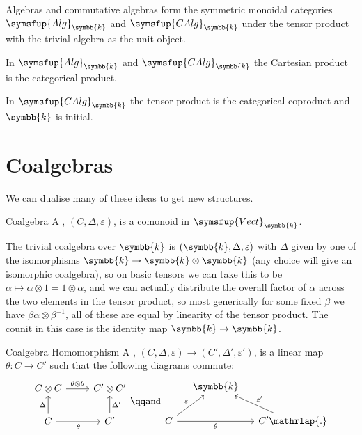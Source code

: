 \documentclass[fleqn]{NotesClass}
\makeatletter
\newcommand{\c@egory}[1]{\symsfup{#1}}
\newcommand{\Vect}[1][\field]{\c@egory{Vect}_{#1}}
\newcommand{\Alg}[1][\field]{\c@egory{Alg}_{#1}}
\newcommand{\CAlg}[1][\field]{\c@egory{CAlg}_{#1}}
\renewcommand{\field}{\symbb{k}}
\makeatother
\begin{document}
    \begin{thm}{}{}
        Algebras and commutative algebras form the symmetric monoidal categories \(\Alg\) and \(\CAlg\) under the tensor product with the trivial algebra as the unit object.
        
        In \(\Alg\) and \(\CAlg\) the Cartesian product is the categorical product.
        
        In \(\CAlg\) the tensor product is the categorical coproduct and \(\field\) is initial.
    \end{thm}
    
    \section{Coalgebras}
    We can dualise many of these ideas to get new structures.
    
    \begin{dfn}{Coalgebra}{}
        A , \((C, \Delta, \varepsilon)\), is a comonoid in \(\Vect\).
    \end{dfn}
    
    \begin{exm}{}{}
        The trivial coalgebra over \(\field\) is \((\field, \Delta, \varepsilon)\) with \(\Delta\) given by one of the isomorphisms \(\field \to \field \otimes \field\) (any choice will give an isomorphic coalgebra), so on basic tensors we can take this to be \(\alpha \mapsto \alpha \otimes 1 = 1 \otimes \alpha\), and we can actually distribute the overall factor of \(\alpha\) across the two elements in the tensor product, so most generically for some fixed \(\beta\) we have \(\beta \alpha \otimes \beta^{-1}\), all of these are equal by linearity of the tensor product.
        The counit in this case is the identity map \(\field \to \field\).
    \end{exm}
    
    \begin{dfn}{Coalgebra Homomorphism}{}
        A , \((C, \Delta, \varepsilon) \to (C', \Delta', \varepsilon')\), is a linear map \(\theta \colon C \to C'\) such that the following diagrams commute:
        \begin{equation}
            \begin{tikzcd}
                C \otimes C \arrow[r, "\theta \otimes \theta"] & C' \otimes C'\\
                C \arrow[u, "\Delta"] \arrow[r, "\theta"'] & C' \arrow[u, "\Delta'"']
            \end{tikzcd}
            \qqand
            \begin{tikzcd}[column sep=small]
                & \field\\
                C \arrow[ur, "\varepsilon"] \arrow[rr, "\theta"'] && C' \mathrlap{.} \arrow[ul, "\varepsilon'"']
            \end{tikzcd}
        \end{equation}
    \end{dfn}
    
\end{document}
